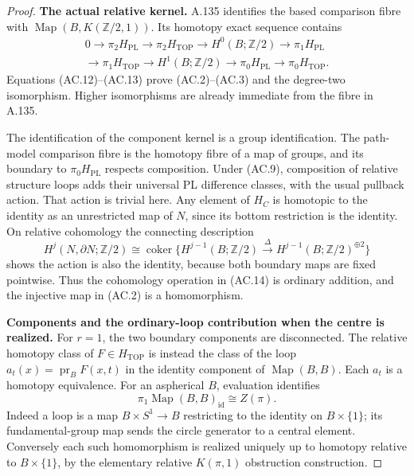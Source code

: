 \begin{proof}
\textbf{The actual relative kernel.}
A.135 identifies the based comparison fibre with
$\operatorname{Map}(B,K(\mathbb Z/2,1))$. Its homotopy exact sequence
contains
\[
\begin{split}
0\longrightarrow\pi_2H_{\mathrm{PL}}
 \longrightarrow\pi_2H_{\mathrm{TOP}}
 \longrightarrow H^0(B;\mathbb Z/2)
 \longrightarrow\pi_1H_{\mathrm{PL}}\\
 \longrightarrow\pi_1H_{\mathrm{TOP}}
 \longrightarrow H^1(B;\mathbb Z/2)
 \longrightarrow\pi_0H_{\mathrm{PL}}
 \longrightarrow\pi_0H_{\mathrm{TOP}}.
\end{split}                                                       \tag{AC.14}
\]
Equations (AC.12)--(AC.13) prove (AC.2)--(AC.3) and the degree-two
isomorphism. Higher isomorphisms are already immediate from the
fibre in A.135.

The identification of the component kernel is a group identification.
The path-model comparison fibre is the homotopy fibre of a map of
groups, and its boundary to $\pi_0H_{\mathrm{PL}}$ respects composition.
Under (AC.9), composition of relative structure loops adds their
universal PL difference classes, with the usual pullback action.
That action is trivial here. Any element of $H_C$ is homotopic to
the identity as an unrestricted map of $N$, since its bottom
restriction is the identity. On relative cohomology the connecting
description
\[
 H^j(N,\partial N;\mathbb Z/2)
  \cong \operatorname{coker}\{H^{j-1}(B;\mathbb Z/2)
     \xrightarrow{\Delta}H^{j-1}(B;\mathbb Z/2)^{\oplus2}\}
\]
shows the action is also the identity, because both boundary maps
are fixed pointwise. Thus the cohomology operation in (AC.14) is
ordinary addition, and the injective map in (AC.2) is a homomorphism.

\textbf{Components and the ordinary-loop contribution when the centre is realized.}
For $r=1$, the two boundary components are disconnected. The relative
homotopy class of $F\in H_{\mathrm{TOP}}$ is instead the class of the
loop $a_t(x)=\operatorname{pr}_B F(x,t)$ in the identity component of
$\operatorname{Map}(B,B)$. Each $a_t$ is a homotopy equivalence.
For an aspherical $B$, evaluation identifies
\[
 \pi_1\operatorname{Map}(B,B)_{\mathrm{id}}\cong Z(\pi).           \tag{AC.15}
\]
Indeed a loop is a map $B\times S^1\to B$ restricting to the identity
on $B\times\{1\}$; its fundamental-group map sends the circle
generator to a central element. Conversely each such homomorphism
is realized uniquely up to homotopy relative to $B\times\{1\}$,
by the elementary relative $K(\pi,1)$ obstruction construction.


\end{proof}
